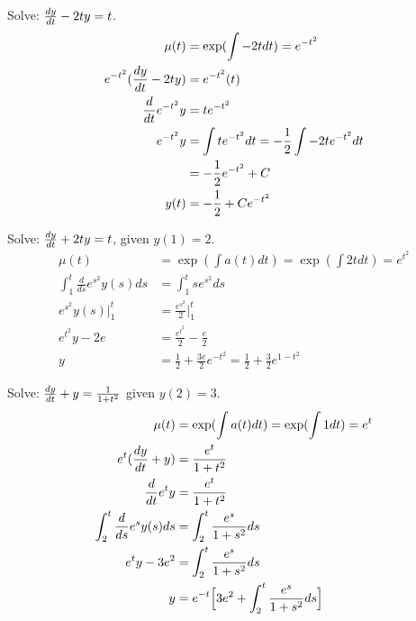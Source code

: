 \documentclass[12pt]{article}
\begin{document}
\begin{example} Solve: $\frac{dy}{dt} - 2ty = t$. $$ \begin{aligned} \mu(t) &= \exp(\int -2tdt) = e^{-t^2} \\ e^{-t^2}(\frac{dy}{dt} - 2ty) &= e^{-t^2}(t) \\ \frac{d}{dt} e^{-t^2}y &= te^{-t^2} \\ e^{-t^2}y &= \int te^{-t^2}dt = -\frac{1}{2}\int -2te^{-t^2}dt \\ &= -\frac{1}{2}e^{-t^2} + C \\ y(t) &= -\frac{1}{2} + Ce^{-t^2} \end{aligned} $$ \end{example} 
\begin{example} Solve: $\frac{dy}{dt} + 2ty = t$, given $y(1) = 2$. $$\begin{aligned} 
\mu(t) &= \exp(\int a(t)dt) = \exp(\int 2tdt) = e^{t^2} \\ \int_1^t \frac{d}{ds}e^{s^2}y(s)ds &= \int_1^t se^{s^2}ds \\ e^{s^2}y(s)\Big|_1^t &= \frac{e^{s^2}}{2}\Big|_{1}^t \\ e^{t^2}y - 2e &= \frac{e^{t^2}}{2} - \frac{e}{2} \\ y &= \frac{1}{2} + \frac{3e}{2}e^{-t^2} = \frac{1}{2} + \frac{3}{2}e^{1 - t^2} \end{aligned} $$ \end{example} 
\begin{example} Solve: $\frac{dy}{dt} + y = \frac{1}{1 + t^2}$ given $y(2) = 3$. $$ \begin{aligned} \mu(t) &= \exp(\int a(t)dt) = \exp(\int 1dt) = e^t \\ e^t(\frac{dy}{dt} + y) &= \frac{e^t}{1 + t^2} \\ \frac{d}{dt}e^ty &= \frac{e^t}{1 + t^2} \\ \int_2^t \frac{d}{ds}e^sy(s)ds &= \int_2^t \frac{e^s}{1 + s^2}ds \\ e^ty - 3e^2 &= \int_2^t \frac{e^s}{1 + s^2}ds \\ y &= e^{-t}\Big[3e^2 + \int_2^t \frac{e^s}{1 + s^2}ds\Big] \end{aligned} $$ \end{example}
\end{document}
